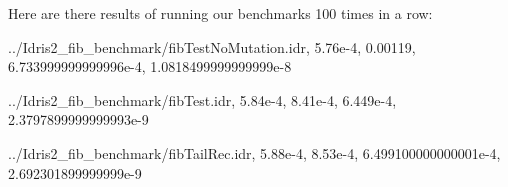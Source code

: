 \documentclass[
]{article}
\newenvironment{Shaded}{}{}
\newcommand{\DataTypeTok}[1]{\textcolor[rgb]{0.56,0.13,0.00}{#1}}
\newcommand{\FloatTok}[1]{\textcolor[rgb]{0.25,0.63,0.44}{#1}}
\newcommand{\NormalTok}[1]{#1}
\newcommand{\OperatorTok}[1]{\textcolor[rgb]{0.40,0.40,0.40}{#1}}
\begin{document}
Here are there results of running our benchmarks 100 times in a row:

\begin{Shaded}
\begin{Highlighting}[]
\OperatorTok{../}\DataTypeTok{Idris2\_fib\_benchmark}\OperatorTok{/}\NormalTok{fibTestNoMutation}\OperatorTok{.}\NormalTok{idr,}
\FloatTok{5.76e{-}4}\NormalTok{,}
\FloatTok{0.00119}\NormalTok{,}
\FloatTok{6.733999999999996e{-}4}\NormalTok{,}
\FloatTok{1.0818499999999999e{-}8}

\OperatorTok{../}\DataTypeTok{Idris2\_fib\_benchmark}\OperatorTok{/}\NormalTok{fibTest}\OperatorTok{.}\NormalTok{idr,}
\FloatTok{5.84e{-}4}\NormalTok{,}
\FloatTok{8.41e{-}4}\NormalTok{,}
\FloatTok{6.449e{-}4}\NormalTok{,}
\FloatTok{2.3797899999999993e{-}9}

\OperatorTok{../}\DataTypeTok{Idris2\_fib\_benchmark}\OperatorTok{/}\NormalTok{fibTailRec}\OperatorTok{.}\NormalTok{idr,}
\FloatTok{5.88e{-}4}\NormalTok{,}
\FloatTok{8.53e{-}4}\NormalTok{,}
\FloatTok{6.499100000000001e{-}4}\NormalTok{,}
\FloatTok{2.692301899999999e{-}9}


\end{Highlighting}
\end{Shaded}
\end{document}
